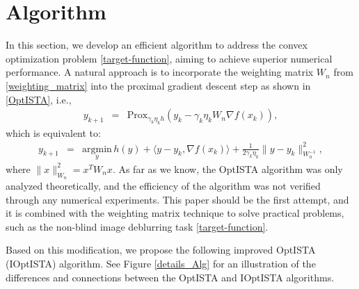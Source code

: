 \documentclass{article}
\begin{document}
\section{Algorithm} \label{algorithms-part}
In this section, we develop an efficient algorithm to address the convex optimization problem \eqref{target-function}, aiming to achieve superior numerical performance. A natural approach is to incorporate the weighting matrix $W_{n}$ from \eqref{weighting_matrix} into the proximal gradient descent step as shown in \eqref{OptISTA}, i.e.,
\begin{eqnarray}
y_{k+1} &=& \mathrm{Prox}_{\gamma_{k}\eta_{k} h}(y_{k} - \gamma_{k}\eta_{k} W_{n} \nabla f(x_{k})),
\end{eqnarray}
which is equivalent to:
\begin{eqnarray}
y_{k+1} &=& \underset{y}{\text{argmin}} \, h(y) + \langle y - y_{k}, \nabla f(x_{k}) \rangle + \frac{1}{2\gamma_{k}\eta_{k}} \|y - y_{k}\|^{2}_{W_{n}^{-1}}, 
\end{eqnarray}
where $\|x\|^{2}_{W_{n}} = x^{T}W_{n}x$. As far as we know, the OptISTA algorithm \cite{JangGR23} was only analyzed theoretically, and the efficiency of the algorithm was not verified through any numerical experiments. This paper should be the first attempt, and it is combined with the weighting matrix technique to solve practical problems, such as the non-blind image deblurring task \eqref{target-function}.

Based on this modification, we propose the following improved OptISTA (IOptISTA) algorithm. See Figure \ref{details_Alg} for an illustration of the differences and connections between the OptISTA and IOptISTA algorithms.
\end{document}
